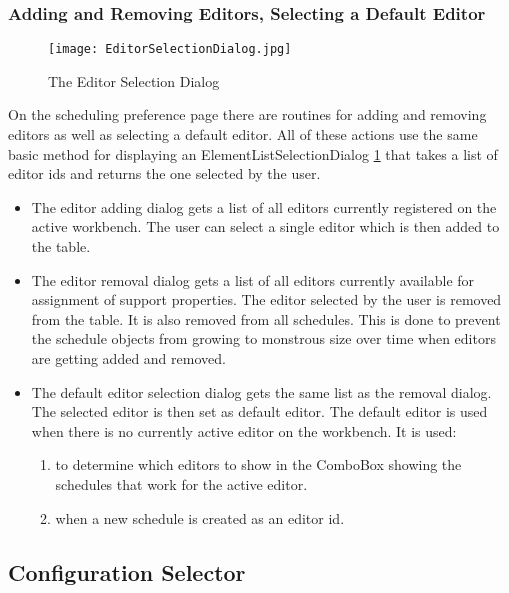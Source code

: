 \subsubsection{Adding and Removing Editors, Selecting a Default Editor}

\begin{figure}[EditorSelectionDialog]
  \centering
  \texttt{[image: EditorSelectionDialog.jpg]}
  \caption[Editor Selection Dialog]%
  {The Editor Selection Dialog\protect}
  \label{fig:EditorSelectionDialog}
\end{figure}

On the scheduling preference page there are routines for adding and removing
editors as well as selecting a default editor.
All of these actions use the same basic method for displaying an ElementListSelectionDialog \ref{fig:EditorSelectionDialog}
that takes a list of editor ids and returns the one selected by the user.
\begin{itemize}
 \item The editor adding dialog gets a list of all editors currently registered on the
 active workbench. The user can select a single editor which is then added to the table.
 \item The editor removal dialog gets a list of all editors currently available for 
 assignment of support properties. The editor selected by the user is removed from the table.
 It is also removed from all schedules. This is done to prevent the schedule objects from growing
 to monstrous size over time when editors are getting added and removed.
 \item The default editor selection dialog gets the same list as the removal dialog. The selected
 editor is then set as default editor. The default editor is used when there is no currently active editor on the workbench.
  It is used:
  \begin{enumerate}
   \item to determine which editors to show in the ComboBox showing the schedules that work for the active editor.
   \item when a new schedule is created as an editor id.
  \end{enumerate}
\end{itemize}


\subsection{Configuration Selector}
\label{section:ConfigurationSelector}

